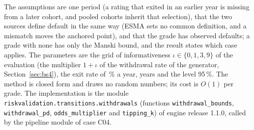 The assumptions are one period (a rating that exited in an earlier year is missing from a later cohort, and pooled cohorts inherit that selection), that the two sources define default in the same way (ESMA sets no common definition, and a mismatch moves the anchored point), and that the grade has observed defaults; a grade with none has only the Manski bound, and the result states which case applies.
The parameters are the grid of informativeness $\iota\in\{0,1,3,9\}$ of the evaluation (the multiplier $1+\iota$ of the withdrawal rate of the generator, Section~\ref{sec:bs4}), the exit rate of \pxFourteenExitRate{}\,\% a year, \pxFourteenYears{} years and the level 95\,\%. The method is closed form and draws no random numbers; its cost is $O(1)$ per grade. The implementation is the module \texttt{riskvalidation.transitions.withdrawals}
(functions \texttt{withdrawal\_bounds}, \texttt{withdrawal\_pd}, \texttt{odds\_multiplier} and \texttt{tipping\_k}) of engine release 1.1.0, called by the pipeline module  of case C04.

